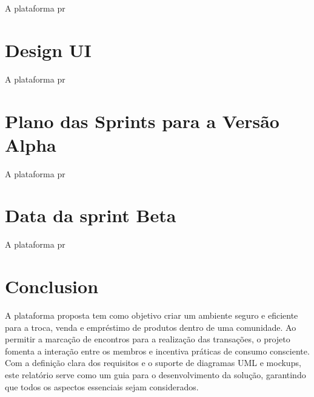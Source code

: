 \documentclass[a4paper, 12pt]{article} %
\begin{document}
A plataforma pr

\newpage
\section*{Design UI}

A plataforma pr

\newpage
\section*{Plano das Sprints para a Versão Alpha }

A plataforma pr

\newpage
\section*{Data da sprint Beta}

A plataforma pr

\newpage
\section*{Conclusion}

A plataforma proposta tem como objetivo criar um ambiente seguro e eficiente para a troca, venda e empréstimo de produtos dentro de uma comunidade. Ao permitir a marcação de encontros para a realização das transações, o projeto fomenta a interação entre os membros e incentiva práticas de consumo consciente. 
Com a definição clara dos requisitos e o suporte de diagramas UML e mockups, este relatório serve como um guia para o desenvolvimento da solução, garantindo que todos os aspectos essenciais sejam considerados.







\end{document}
